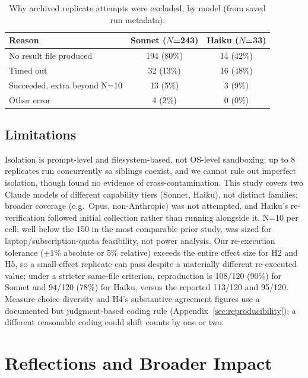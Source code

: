 \documentclass{article}
\begin{document}
\begin{table}[h]
  \caption{Why archived replicate attempts were excluded, by model (from saved run
  metadata).}
  \label{tab:archive}
  \centering
  \footnotesize
  \begin{tabular}{lcc}
    \toprule
    Reason & Sonnet ($N$=243) & Haiku ($N$=33) \\
    \midrule
    No result file produced & 194 (80\%) & 14 (42\%) \\
    Timed out & 32 (13\%) & 16 (48\%) \\
    Succeeded, extra beyond N=10 & 13 (5\%) & 3 (9\%) \\
    Other error & 4 (2\%) & 0 (0\%) \\
    \bottomrule
  \end{tabular}
\end{table}

\subsection{Limitations}
\label{sec:limitations}

Isolation is prompt-level and filesystem-based, not OS-level sandboxing; up to 8
replicates run concurrently so siblings coexist, and we cannot rule out imperfect
isolation, though found no evidence of cross-contamination. This study covers two Claude
models of different capability tiers (Sonnet, Haiku), not distinct families; broader
coverage (e.g.\ Opus, non-Anthropic) was not attempted, and Haiku's re-verification
followed initial collection rather than running alongside it. N=10 per cell, well below
the 150 in the most comparable prior study, was sized for laptop/subscription-quota
feasibility, not power analysis. Our re-execution tolerance ($\pm$1\% absolute or 5\%
relative) exceeds the entire effect size for H2 and H5, so a small-effect replicate can
pass despite a materially different re-executed value; under a stricter same-file
criterion, reproduction is 108/120 (90\%) for Sonnet and 94/120 (78\%) for Haiku, versus
the reported 113/120 and 95/120. Measure-choice diversity and H4's substantive-agreement
figures use a documented but judgment-based coding rule
(Appendix~\ref{sec:reproducibility}); a different reasonable coding could shift counts by
one or two.

\clearpage
\section{Reflections and Broader Impact}
\end{document}
